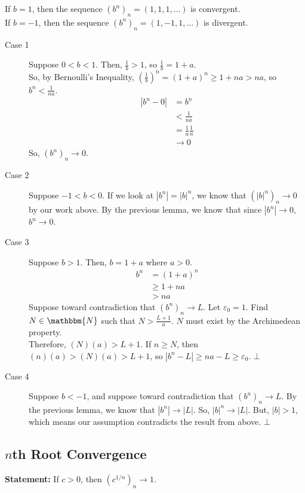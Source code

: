 \documentclass[10pt]{extarticle}
\newcommand{\N}{\mathbbm{N}}
\begin{document}
    If $b = 1$, then the sequence $(b^n)_n = (1,1,1,\dots)$ is convergent.\\

    If $b = -1$, then the sequence $(b^n)_n = (1,-1,1,\dots)$ is divergent.
    \begin{description}
      \item[Case 1] Suppose $0 < b < 1$. Then, $\frac{1}{b}> 1$, so $\frac{1}{b} = 1+a$.\\

        So, by Bernoulli's Inequality, $\left(\frac{1}{b}\right)^n = \left(1+a\right)^n \geq 1 + na > na$, so $b^n < \frac{1}{na}$.
        \begin{align*}
          |b^n-0| &= b^n\\
                  &< \frac{1}{na}\\
                  &= \frac{1}{a}\frac{1}{n}\\
                  &\rightarrow 0
        \end{align*}
        So, $\left(b^n\right)_n \rightarrow 0$.
      \item[Case 2] Suppose $-1 < b < 0$. If we look at $|b^n| = |b|^n$, we know that $\left(|b|^n\right)_n \rightarrow 0$ by our work above. By the previous lemma, we know that since $|b^n|\rightarrow 0$, $b^n \rightarrow 0$.
      \item[Case 3] Suppose $b > 1$. Then, $b = 1 + a$ where $a > 0$.
        \begin{align*}
          b^n &= (1+a)^n\\
              &\geq 1 + na \tag*{Bernoulli's Inequality}\\
              &> na
        \end{align*}
        Suppose toward contradiction that $\left(b^n\right)_n \rightarrow L$. Let $\varepsilon_0 = 1$. Find $N\in \N$ such that $N > \frac{L + 1}{a}$. $N$ must exist by the Archimedean property.\\

        Therefore, $(N)(a) > L+1$. If $n\geq N$, then $(n)(a) > (N)(a) > L+1$, so $|b^n - L| \geq na - L \geq \varepsilon_0$. $\bot$
      \item[Case 4] Suppose $b < -1$, and suppose toward contradiction that $(b^n)_n \rightarrow L$. By the previous lemma, we know that $|b^n| \rightarrow |L|$. So, $|b|^n \rightarrow |L|$. But, $|b| > 1$, which means our assumption contradicts the result from above. $\bot$
    \end{description}
  \subsection{$n$th Root Convergence}%
  \textbf{Statement:} If $c > 0$, then $\left(c^{1/n}\right)_n \rightarrow 1$.
    
\end{document}
